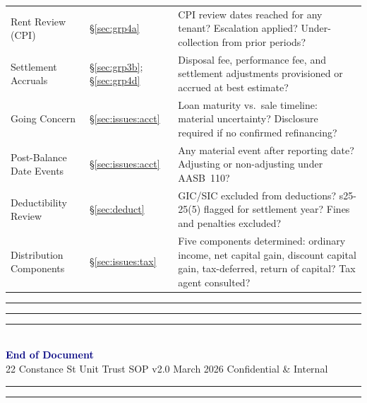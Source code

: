 \documentclass[10pt,a4paper]{article}
\begin{document}
{\begin{tabularx}{\textwidth}{@{} L{3.4cm} L{1.6cm} X @{}}
Rent Review (CPI) & \S\ref{sec:grp4a} & CPI review dates reached for any tenant? Escalation applied? Under-collection from prior periods? \\
Settlement Accruals & \S\ref{sec:grp3b}; \S\ref{sec:grp4d} & Disposal fee, performance fee, and settlement adjustments provisioned or accrued at best estimate? \\
Going Concern & \S\ref{sec:issues:acct} & Loan maturity vs.\ sale timeline: material uncertainty? Disclosure required if no confirmed refinancing? \\
Post-Balance Date Events & \S\ref{sec:issues:acct} & Any material event after reporting date? Adjusting or non-adjusting under AASB~110? \\
Deductibility Review & \S\ref{sec:deduct} & GIC/SIC excluded from deductions? s25-25(5) flagged for settlement year? Fines and penalties excluded? \\
Distribution Components & \S\ref{sec:issues:tax} & Five components determined: ordinary income, net capital gain, discount capital gain, tax-deferred, return of capital? Tax agent consulted? \\
\bottomrule
\end{tabularx}}

\vfill
\begin{center}
\textcolor{gold}{\rule{4cm}{0.5pt}}\hspace{0.5em}\textcolor{navy}{\rule{4cm}{1.2pt}}\hspace{0.5em}\textcolor{gold}{\rule{4cm}{0.5pt}}\\[0.7em]
{\sffamily\large\bfseries\textcolor{navy}{End of Document}}\\[0.3em]
{\sffamily\footnotesize\textcolor{textgray}{22 Constance St Unit Trust \textbullet{} SOP v2.0 \textbullet{} March 2026 \textbullet{} Confidential \& Internal}}\\[0.4em]
\textcolor{gold}{\rule{2cm}{0.3pt}}\hspace{0.3em}{\sffamily\tiny\textcolor{steel}{$\blacklozenge$}}\hspace{0.3em}\textcolor{gold}{\rule{2cm}{0.3pt}}
\end{center}
\end{document}
